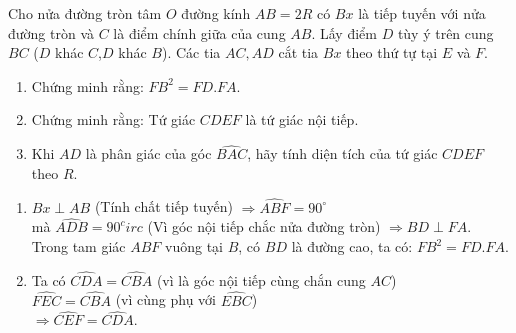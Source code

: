 \begin{ex}%
Cho nửa đường tròn tâm $O$ đường kính $AB=2R$ có $Bx$ là tiếp tuyến với nửa đường tròn và $C$ là điểm chính giữa của cung $AB$. Lấy điểm $D$ tùy ý trên cung $BC$ ($D$ khác $C$,$D$ khác $B$). Các tia $AC,AD$ cắt tia $Bx$ theo thứ tự tại $E$ và $F$.
\begin{enumerate}
	\item Chứng minh rằng: $FB^2=FD.FA$.
	\item Chứng minh rằng: Tứ giác $CDEF$ là tứ giác nội tiếp.
	\item Khi $AD$ là phân giác của góc $\widehat{BAC}$, hãy tính diện tích của tứ giác $CDEF$ theo $R$.
\end{enumerate}
\begin{center}
\end{center}
\loigiai
{\begin{enumerate}
		\item $Bx \perp AB$ (Tính chất tiếp tuyến) $\Rightarrow \widehat{ABF}=90^\circ$\\
		mà $\widehat{ADB}=90^circ$ (Vì góc nội tiếp chắc nửa đường tròn) $\Rightarrow BD\perp FA$.\\
		Trong tam giác $ABF$ vuông tại $B$, có $BD$ là đường cao, ta có: $FB^2=FD.FA$.
		\item Ta có $\widehat{CDA}=\widehat{CBA}$ (vì là góc nội tiếp cùng chắn cung $AC$)\\
		$\widehat{FEC}=\widehat{CBA}$ (vì cùng phụ với $\widehat{EBC}$)\\
		$\Rightarrow \widehat{CEF}=\widehat{CDA}$.\\

\end{enumerate}}
\end{ex}
